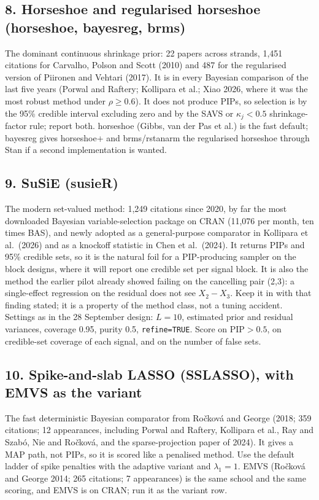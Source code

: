 \documentclass[11pt,letterpaper]{article}
\newcommand{\code}[1]{\texttt{#1}}
\newcommand{\pkg}[1]{\textsf{#1}}
\begin{document}
\subsection*{8. Horseshoe and regularised horseshoe (\pkg{horseshoe}, \pkg{bayesreg}, \pkg{brms})}
The dominant continuous shrinkage prior: 22 papers across strands, 1{,}451 citations for Carvalho, Polson and Scott (2010) and 487 for the regularised version of Piironen and Vehtari (2017). It is in every Bayesian comparison of the last five years (Porwal and Raftery; Kollipara et al.; Xiao 2026, where it was the most robust method under $\rho\ge 0.6$). It does not produce PIPs, so selection is by the 95\% credible interval excluding zero and by the SAVS or $\kappa_j<0.5$ shrinkage-factor rule; report both. \pkg{horseshoe} (Gibbs, van der Pas et al.) is the fast default; \pkg{bayesreg} gives horseshoe+ and \pkg{brms}/\pkg{rstanarm} the regularised horseshoe through Stan if a second implementation is wanted.

\subsection*{9. SuSiE (\pkg{susieR})}
The modern set-valued method: 1{,}249 citations since 2020, by far the most downloaded Bayesian variable-selection package on CRAN (11{,}076 per month, ten times \pkg{BAS}), and newly adopted as a general-purpose comparator in Kollipara et al.\ (2026) and as a knockoff statistic in Chen et al.\ (2024). It returns PIPs and 95\% credible sets, so it is the natural foil for a PIP-producing sampler on the block designs, where it will report one credible set per signal block. It is also the method the earlier pilot already showed failing on the cancelling pair (2,3): a single-effect regression on the residual does not see $X_2-X_3$. Keep it in with that finding stated; it is a property of the method class, not a tuning accident. Settings as in the 28 September design: $L=10$, estimated prior and residual variances, coverage 0.95, purity 0.5, \code{refine=TRUE}. Score on PIP$>0.5$, on credible-set coverage of each signal, and on the number of false sets.

\subsection*{10. Spike-and-slab LASSO (\pkg{SSLASSO}), with EMVS as the variant}
The fast deterministic Bayesian comparator from Ročková and George (2018; 359 citations; 12 appearances, including Porwal and Raftery, Kollipara et al., Ray and Szabó, Nie and Ročková, and the sparse-projection paper of 2024). It gives a MAP path, not PIPs, so it is scored like a penalised method. Use the default ladder of spike penalties with the adaptive variant and $\lambda_1=1$. EMVS (Ročková and George 2014; 265 citations; 7 appearances) is the same school and the same scoring, and \pkg{EMVS} is on CRAN; run it as the variant row.
\end{document}
